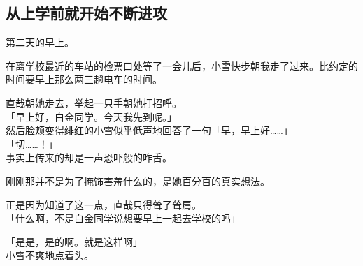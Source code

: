 \subsection{从上学前就开始不断进攻}

第二天的早上。

在离学校最近的车站的检票口处等了一会儿后，小雪快步朝我走了过来。比约定的时间要早上那么两三趟电车的时间。

直哉朝她走去，举起一只手朝她打招呼。\\

「早上好，白金同学。今天我先到呢。」\\

然后脸颊变得绯红的小雪似乎低声地回答了一句「早，早上好……」\\

「切……！」\\

事实上传来的却是一声恐吓般的咋舌。

刚刚那并不是为了掩饰害羞什么的，是她百分百的真实想法。

正是因为知道了这一点，直哉只得耸了耸肩。\\

「什么啊，不是白金同学说想要早上一起去学校的吗」

「是是，是的啊。就是这样啊」\\

小雪不爽地点着头。\\


